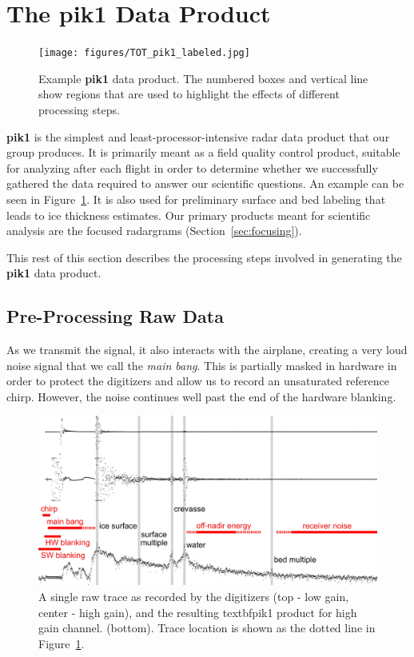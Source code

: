 \documentclass[11pt]{article}
\newcommand{\secref}[1]{Section~\ref{#1}}
\newcommand{\figref}[1]{Figure~\ref{#1}}
\begin{document}
\section{The \textbf{pik1} Data Product}
\label{sec:pik1}

\begin{figure}[ht!]
\centering
\texttt{[image: figures/TOT\_pik1\_labeled.jpg]}
\caption[]{Example \textbf{pik1} data product. The numbered boxes and vertical line show regions that are used to highlight the effects of different processing steps.}
\label{fig:pik1}
\end{figure}


\textbf{pik1} is the simplest and least-processor-intensive radar data product that our group produces. It is primarily meant as a field quality control product, suitable for analyzing after each flight in order to determine whether we successfully gathered the data required to answer our scientific questions. An example can be seen in \figref{fig:pik1}. It is also used for preliminary surface and bed labeling that leads to ice thickness estimates. Our primary products meant for scientific analysis are the focused radargrams (\secref{sec:focusing}).

This rest of this section describes the processing steps involved in generating the \textbf{pik1} data product. 

\subsection{Pre-Processing Raw Data}
\label{sec:blanking}

As we transmit the signal, it also interacts with the airplane, creating a very loud noise signal that we call the \emph{main bang}. This is partially masked in hardware in order to protect the digitizers and allow us to record an unsaturated reference chirp. However, the noise continues well past the end of the hardware blanking. 

\begin{figure}[ht!]
\centering
\includegraphics[width=1.0\columnwidth]{figures/trace.jpg}
\caption[]{A single raw trace as recorded by the digitizers (top - low gain, center - high gain), and the resulting textbf{pik1} product for high gain channel. (bottom). Trace location is shown as the dotted line in \figref{fig:pik1}.}
\label{fig:trace}
\end{figure}
\end{document}
